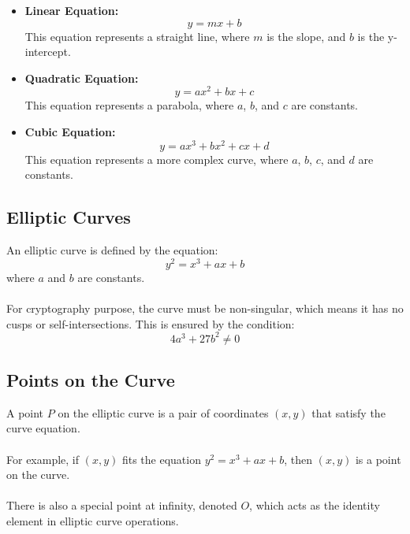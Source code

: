 \documentclass[11pt, letterpaper]{article}
\begin{document}
\begin{itemize}
\item \textbf{Linear Equation:}
\begin{equation}
y = mx + b
\end{equation}
This equation represents a straight line, where \(m\) is the slope, and \(b\) is the y-intercept.

\item \textbf{Quadratic Equation:}
\begin{equation}
y = ax^2 + bx + c
\end{equation}
This equation represents a parabola, where \(a\), \(b\), and \(c\) are constants.


\item \textbf{Cubic Equation:}
\begin{equation}
y = ax^3 + bx^2 + cx + d
\end{equation}
This equation represents a more complex curve, where \(a\), \(b\), \(c\), and \(d\) are constants.

\end{itemize}


\subsection{Elliptic Curves}
An elliptic curve is defined by the equation:
\begin{equation}
y^2 = x^3 + ax + b
\end{equation}
where \(a\) and \(b\) are constants. 
\\ \\
For cryptography purpose, the curve must be non-singular, which means it has no cusps or self-intersections. This is ensured by the condition:
\begin{equation}
4a^3 + 27b^2 \neq 0
\end{equation}

\subsection{Points on the Curve}
A point \(P\) on the elliptic curve is a pair of coordinates \((x, y)\) that satisfy the curve equation. \\ \\
For example, if \((x, y)\) fits the equation \(y^2 = x^3 + ax + b\), then \((x, y)\) is a point on the curve.
\\ \\
There is also a special point at infinity, denoted \(O\), which acts as the identity element in elliptic curve operations.
\end{document}
